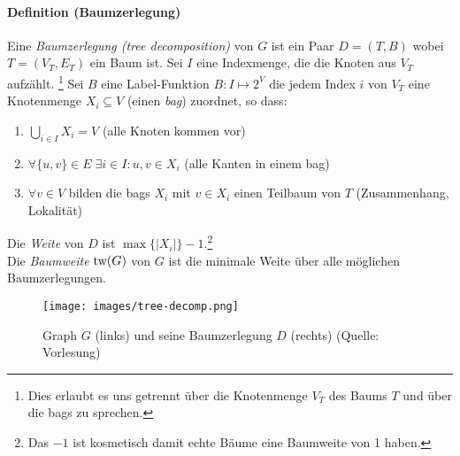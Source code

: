 \paragraph{Definition (Baumzerlegung)}
Eine \emph{Baumzerlegung (tree decomposition)} von $G$ ist ein Paar $D = (T, B)$
wobei $T = (V_T, E_T)$ ein Baum ist.
Sei $I$ eine Indexmenge, die die Knoten aus $V_T$ aufzählt.%
\footnote{Dies erlaubt es uns getrennt über die Knotenmenge $V_T$ des Baums $T$ und über die bags zu sprechen.}
Sei $B$ eine Label-Funktion $B : I \mapsto 2^V$ die jedem Index $i$ von $V_T$ eine Knotenmenge $X_i \subseteq V$
(einen \emph{bag}) zuordnet, so dass:
\begin{enumerate}[label=(\roman*)]
    \item $ \bigcup_{i \in I} X_i = V $ (alle Knoten kommen vor)
    \item $ \forall \{u,v\} \in E \; \exists i \in I : u, v \in X_i $ (alle Kanten in einem bag)
    \item $ \forall v \in V $ bilden die bags $X_i$ mit $v \in X_i$ einen Teilbaum von $T$ (Zusammenhang, Lokalität)
\end{enumerate}

Die \emph{Weite} von $D$ ist $\max \{|X_i|\} - 1$.\footnote{Das $-1$ ist kosmetisch damit echte Bäume eine Baumweite von 1 haben.} \\
Die \emph{Baumweite} $\text{tw}(G)$ von $G$ ist die minimale Weite über alle möglichen Baumzerlegungen.

\begin{figure}[h]
    \centering
    \texttt{[image: images/tree-decomp.png]}
    \caption{Graph $G$ (links) und seine Baumzerlegung $D$ (rechts) (Quelle: Vorlesung)}
    \label{fig:tree-decomp}
\end{figure}

